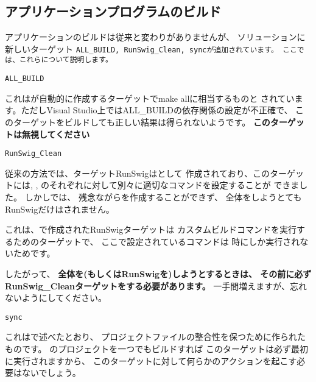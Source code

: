 \subsection{アプリケーションプログラムのビルド}
\label{subsec:BuildApplication}

\noindent
アプリケーションのビルドは従来と変わりがありませんが、
ソリューションに新しいターゲット
\tt{ALL\_BUILD}, \tt{RunSwig\_Clean}, \tt{sync}が追加されています。
ここでは、これらについて説明します。

\medskip
\noindent
\tt{ALL\_BUILD}
\begin{narrow}[20pt]
	これは\cmake が自動的に作成するターゲットでmake allに相当するものと
	されています。ただしVisual Studio上ではALL\_BUILDの依存関係の設定が不正確で、
	このターゲットをビルドしても正しい結果は得られないようです。
	{\bf{このターゲットは無視してください}}
\end{narrow}

\noindent
\tt{RunSwig\_Clean}
\begin{narrow}[20pt]
	従来の方法では、ターゲットRunSwigはとして
	作成されており、このターゲットには, ,
	のそれぞれに対して別々に適切なコマンドを設定することが
	できました。
	しかし\cmake では、
	残念ながらを作成することができず、
	全体をしようとてもRunSwigだけはされません。
	\begin{narrow}[s][15pt]
		これは、\cmake で作成されたRunSwigターゲットは
		カスタムビルドコマンドを実行するためのターゲットで、
		ここで設定されているコマンドは
		時にしか実行されないためです。
	\end{narrow}
	したがって、
	{\bf{全体を(もしくはRunSwigを)しようとするときは、
	その前に必ずRunSwig\_Cleanターゲットをする必要があります。}}
	一手間増えますが、忘れないようにしてください。
\end{narrow}

\noindent
\tt{sync}
\begin{narrow}[20pt]
	これはで述べたとおり、
	プロジェクトファイルの整合性を保つために作られたものです。
	\SprLib のプロジェクトを一つでもビルドすれば
	このターゲットは必ず最初に実行されますから、
	このターゲットに対して何らかのアクションを起こす必要はないでしょう。
\end{narrow}


